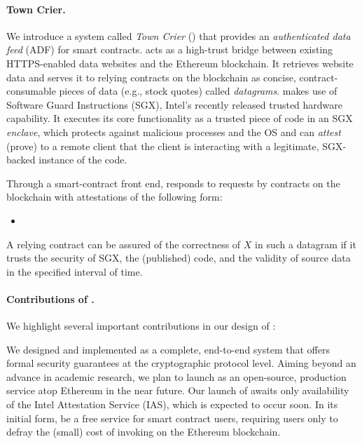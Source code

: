 \paragraph{\bf Town Crier.} We introduce a system called \emph{Town Crier} (\tc) that provides an \emph{authenticated data feed} (ADF) for smart contracts. \tc acts as a high-trust bridge between existing HTTPS-enabled data websites and the Ethereum blockchain. It retrieves website data and serves it to relying contracts on the blockchain as concise, contract-consumable pieces of data (e.g., stock quotes) called \emph{datagrams}. \tc makes use of Software Guard Instructions (SGX),  Intel's recently released trusted hardware capability. It executes its core functionality as a trusted piece of code in an SGX \emph{enclave}, which protects against malicious processes and the OS and can \emph{attest} (prove) to a remote client that the client is interacting with a legitimate, SGX-backed instance of the \tc code. 

Through a smart-contract front end, \tcs responds to requests by contracts on the blockchain with attestations of the following form:

\begin{itemize}[leftmargin=3mm]
\item[]
\end{itemize}

A relying contract can be assured of the correctness of $X$ in such a datagram if it trusts the security of SGX, the (published) \tc code, and the validity of source data in the specified interval of time.

\paragraph{Contributions of \tc.}
We highlight several important contributions in our design of \tc:

\vspace{2mm}
We designed and implemented \tcs as a complete, end-to-end system that offers formal security guarantees
at the cryptographic protocol level. Aiming beyond an advance in academic research, we plan to launch \tcs
as an open-source, production service atop Ethereum in the near future. Our launch of \tc awaits only availability of the Intel Attestation Service (IAS), which is expected to occur soon. In its initial form, \tcs be a free service for smart contract users, requiring users only to defray the (small) cost of invoking \tc on the Ethereum blockchain. 

